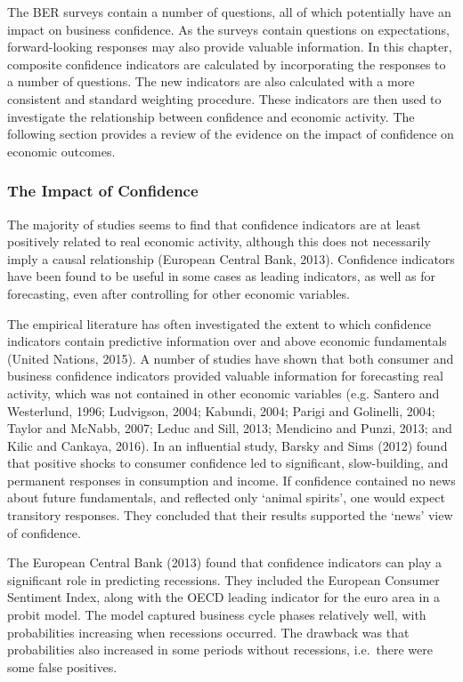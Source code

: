 \documentclass[11pt,]{article}
\begin{document}
The BER surveys contain a number of questions, all of which potentially
have an impact on business confidence. As the surveys contain questions
on expectations, forward-looking responses may also provide valuable
information. In this chapter, composite confidence indicators are
calculated by incorporating the responses to a number of questions. The
new indicators are also calculated with a more consistent and standard
weighting procedure. These indicators are then used to investigate the
relationship between confidence and economic activity. The following
section provides a review of the evidence on the impact of confidence on
economic outcomes.

\subsubsection{The Impact of Confidence}\label{the-impact-of-confidence}

The majority of studies seems to find that confidence indicators are at
least positively related to real economic activity, although this does
not necessarily imply a causal relationship (European Central Bank,
2013). Confidence indicators have been found to be useful in some cases
as leading indicators, as well as for forecasting, even after
controlling for other economic variables.

The empirical literature has often investigated the extent to which
confidence indicators contain predictive information over and above
economic fundamentals (United Nations, 2015). A number of studies have
shown that both consumer and business confidence indicators provided
valuable information for forecasting real activity, which was not
contained in other economic variables (e.g. Santero and Westerlund,
1996; Ludvigson, 2004; Kabundi, 2004; Parigi and Golinelli, 2004; Taylor
and McNabb, 2007; Leduc and Sill, 2013; Mendicino and Punzi, 2013; and
Kilic and Cankaya, 2016). In an influential study, Barsky and Sims
(2012) found that positive shocks to consumer confidence led to
significant, slow-building, and permanent responses in consumption and
income. If confidence contained no news about future fundamentals, and
reflected only `animal spirits', one would expect transitory responses.
They concluded that their results supported the `news' view of
confidence.

The European Central Bank (2013) found that confidence indicators can
play a significant role in predicting recessions. They included the
European Consumer Sentiment Index, along with the OECD leading indicator
for the euro area in a probit model. The model captured business cycle
phases relatively well, with probabilities increasing when recessions
occurred. The drawback was that probabilities also increased in some
periods without recessions, i.e.~there were some false positives.
\end{document}
